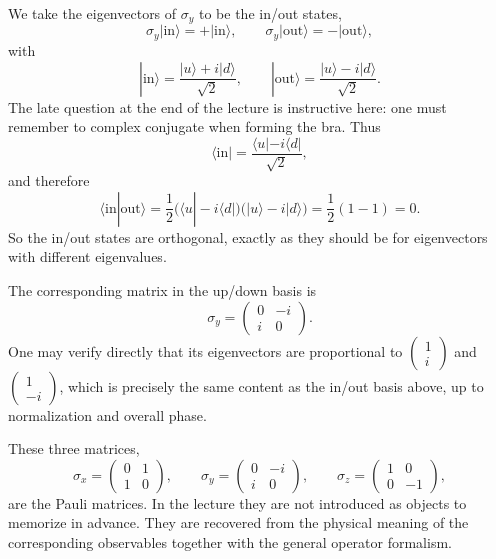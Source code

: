 We take the eigenvectors of \(\sigma_y\) to be the in/out states,
\begin{equation}
\sigma_y|\mathrm{in}\rangle=+|\mathrm{in}\rangle,
\qquad
\sigma_y|\mathrm{out}\rangle=-|\mathrm{out}\rangle,
\end{equation}
with
\begin{equation}
|\mathrm{in}\rangle=\frac{|u\rangle+i|d\rangle}{\sqrt2},
\qquad
|\mathrm{out}\rangle=\frac{|u\rangle-i|d\rangle}{\sqrt2}.
\end{equation}
The late question at the end of the lecture is instructive here: one must remember to complex conjugate when forming the bra. Thus
\begin{equation}
\langle \mathrm{in}|=\frac{\langle u|-i\langle d|}{\sqrt2},
\end{equation}
and therefore
\begin{equation}
\langle \mathrm{in}|\mathrm{out}\rangle
=
\frac{1}{2}\bigl(\langle u|-i\langle d|\bigr)\bigl(|u\rangle-i|d\rangle\bigr)
=
\frac{1}{2}(1-1)=0.
\end{equation}
So the in/out states are orthogonal, exactly as they should be for eigenvectors with different eigenvalues.

The corresponding matrix in the up/down basis is
\begin{equation}
\sigma_y=
\begin{pmatrix}
0 & -i \\
i & 0
\end{pmatrix}.
\end{equation}
One may verify directly that its eigenvectors are proportional to
\(\begin{pmatrix}1\\ i\end{pmatrix}\) and \(\begin{pmatrix}1\\ -i\end{pmatrix}\), which is precisely the same content as the in/out basis above, up to normalization and overall phase.

These three matrices,
\begin{equation}
\sigma_x=
\begin{pmatrix}
0 & 1 \\
1 & 0
\end{pmatrix},
\qquad
\sigma_y=
\begin{pmatrix}
0 & -i \\
i & 0
\end{pmatrix},
\qquad
\sigma_z=
\begin{pmatrix}
1 & 0 \\
0 & -1
\end{pmatrix},
\end{equation}
are the Pauli matrices. In the lecture they are not introduced as objects to memorize in advance. They are recovered from the physical meaning of the corresponding observables together with the general operator formalism.

